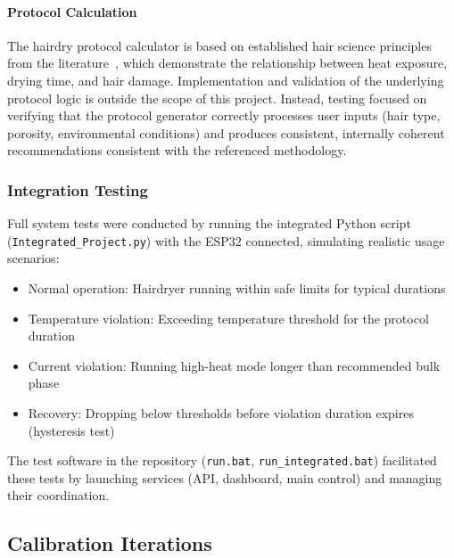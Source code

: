 \documentclass[11pt,a4paper]{article}
\begin{document}
\paragraph{Protocol Calculation}
The hairdry protocol calculator is based on established hair science principles from the literature~\cite{lee_hair_damage}, which demonstrate the relationship between heat exposure, drying time, and hair damage. Implementation and validation of the underlying protocol logic is outside the scope of this project. Instead, testing focused on verifying that the protocol generator correctly processes user inputs (hair type, porosity, environmental conditions) and produces consistent, internally coherent recommendations consistent with the referenced methodology.

\subsubsection*{Integration Testing}

Full system tests were conducted by running the integrated Python script (\texttt{Integrated\_Project.py}) with the ESP32 connected, simulating realistic usage scenarios:
\begin{itemize}
  \item Normal operation: Hairdryer running within safe limits for typical durations
  \item Temperature violation: Exceeding temperature threshold for the protocol duration
  \item Current violation: Running high-heat mode longer than recommended bulk phase
  \item Recovery: Dropping below thresholds before violation duration expires (hysteresis test)
\end{itemize}

The test software in the repository (\texttt{run.bat}, \texttt{run\_integrated.bat}) facilitated these tests by launching services (API, dashboard, main control) and managing their coordination.

\subsection{Calibration Iterations}
\end{document}

